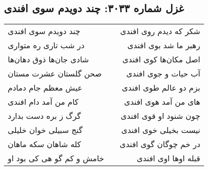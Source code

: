 \begin{center}
\section*{غزل شماره ۳۰۳۳: چند دویدم سوی افندی}
\label{sec:3033}
\begin{longtable}{l p{0.5cm} r}
چند دویدم سوی افندی
&&
شکر که دیدم روی افندی
\\
در شب تاری ره متواری
&&
رهبر ما شد بوی افندی
\\
شادی جان‌ها ذوق دهان‌ها
&&
اصل مکان‌ها کوی افندی
\\
صحن گلستان عشرت مستان
&&
آب حیات و جوی افندی
\\
عیش معظم جام دمادم
&&
بزم دو عالم طوی افندی
\\
کام من آمد دام افندی
&&
های من آمد هوی افندی
\\
گرگ ز بره دست بدارد
&&
چون شنود او قوی افندی
\\
گنج سبیلی خوان خلیلی
&&
نیست بخیلی خوی افندی
\\
کله شاهان سکه ماهان
&&
در خم چوگان گوی افندی
\\
خامش و کم گو هی کی بود او
&&
قبله اوها اوی افندی
\\
\end{longtable}
\end{center}
